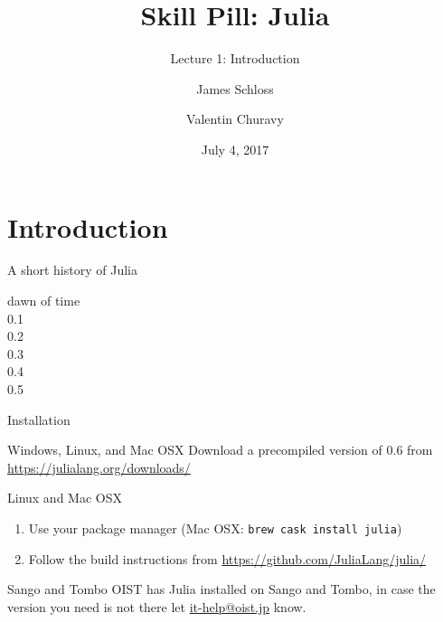 \documentclass{beamer}
\title[Skill Pill]{Skill Pill: Julia} %
\subtitle{Lecture 1: Introduction}
\author{James Schloss \and Valentin Churavy} %
\institute[OIST] %
{
Okinawa Institute of Science and Technology \\ %
\textit{james.schloss@oist.jp}\\
\textit{valentin.churavy@oist.jp} %
}
\date{July 4, 2017} %
\begin{document}

\begin{frame}
\vspace*{1.4cm}
\titlepage %
\end{frame}



\section{Introduction}
\begin{frame}{A short history of Julia}
  \begin{description}
    \item[dawn of time] 
    \item[0.1]
    \item[0.2]
    \item[0.3]
    \item[0.4]
    \item[0.5]
  \end{description}
\end{frame}

\begin{frame}{Installation}
  \begin{block}{Windows, Linux, and Mac OSX}
    Download a precompiled version of 0.6 from \url{https://julialang.org/downloads/}
  \end{block}
  \begin{block}{Linux and Mac OSX}
    \begin{enumerate}
      \item Use your package manager (Mac OSX: \texttt{brew cask install julia})
      \item Follow the build instructions from \url{https://github.com/JuliaLang/julia/}
    \end{enumerate}
  \end{block}
  \begin{block}{Sango and Tombo}
    OIST has Julia installed on Sango and Tombo, in case the version you need is not there let \href{mailto:it-help@oist.jp}{it-help@oist.jp} know.
  \end{block}
\end{frame}
\end{document}
